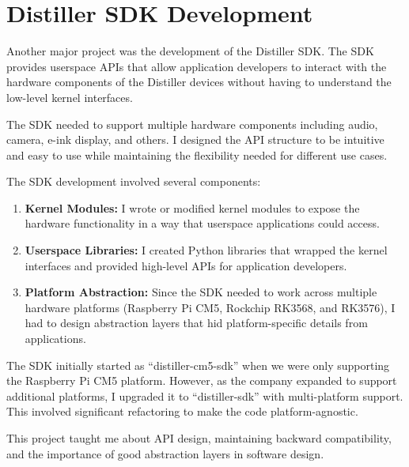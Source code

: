 \documentclass[12pt,a4paper]{report}
\begin{document}
\section{Distiller SDK Development}

Another major project was the development of the Distiller SDK. The SDK provides userspace APIs that allow application developers to interact with the hardware components of the Distiller devices without having to understand the low-level kernel interfaces.

\vspace{0.3cm}

The SDK needed to support multiple hardware components including audio, camera, e-ink display, and others. I designed the API structure to be intuitive and easy to use while maintaining the flexibility needed for different use cases.

\vspace{0.3cm}

The SDK development involved several components:

\begin{enumerate}[itemsep=0.3cm]
    \item \textbf{Kernel Modules:} I wrote or modified kernel modules to expose the hardware functionality in a way that userspace applications could access.

    \item \textbf{Userspace Libraries:} I created Python libraries that wrapped the kernel interfaces and provided high-level APIs for application developers.

    \item \textbf{Platform Abstraction:} Since the SDK needed to work across multiple hardware platforms (Raspberry Pi CM5, Rockchip RK3568, and RK3576), I had to design abstraction layers that hid platform-specific details from applications.
\end{enumerate}

\vspace{0.3cm}

The SDK initially started as ``distiller-cm5-sdk'' when we were only supporting the Raspberry Pi CM5 platform. However, as the company expanded to support additional platforms, I upgraded it to ``distiller-sdk'' with multi-platform support. This involved significant refactoring to make the code platform-agnostic.

\vspace{0.3cm}

This project taught me about API design, maintaining backward compatibility, and the importance of good abstraction layers in software design.
\end{document}
